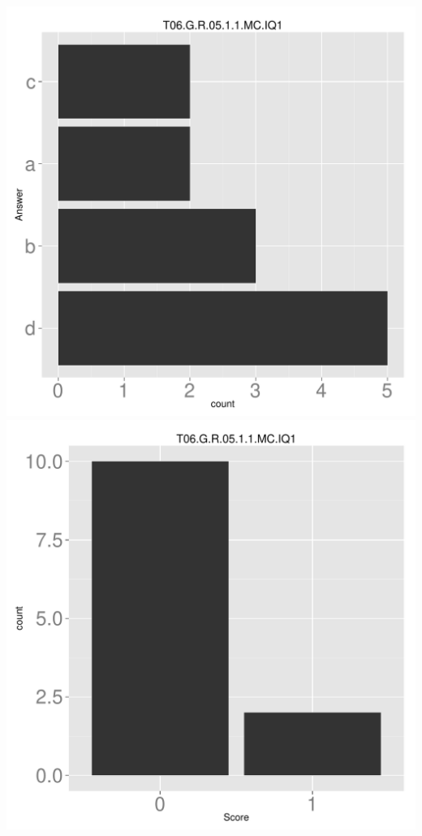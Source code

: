 \documentclass[12pt,nohyper]{tufte-handout}\usepackage[]{graphicx}\usepackage[]{color}
\begin{document}
\begin{center} \includegraphics[width=.45\linewidth]{Topic06_72_answer} \includegraphics[width=.45\linewidth]{Topic06_72_score} \end{center} 
\end{document}
